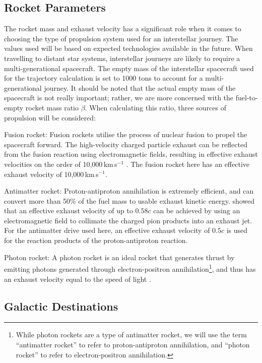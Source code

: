 \documentclass[review]{elsarticle}
\begin{document}
\subsection{Rocket Parameters}
The rocket mass and exhaust velocity has a significant role when it comes to choosing the type of propulsion system used for an interstellar journey. The values used will be based on expected technologies available in the future. When travelling to distant star systems, interstellar journeys are likely to require a multi-generational spacecraft. The empty mass of the interstellar spacecraft used for the trajectory calculation is set to 1000 tons to account for a multi-generational journey. It should be noted that the actual empty mass of the spacecraft is not really important; rather, we are more concerned with the fuel-to-empty rocket mass ratio $\beta$. When calculating this ratio, three sources of propulsion will be considered: 
\begin{itemize*}
\item Fusion rocket: Fusion rockets utilise the process of nuclear fusion to propel the spacecraft forward. The high-velocity charged particle exhaust can be reflected from the fusion reaction using electromagnetic fields, resulting in effective exhaust velocities on the order of 10,000\,km\,s$^{-1}$ \citep{Matloff2010}. The fusion rocket here has an effective exhaust velocity of 10,000\,km\,s$^{-1}$.
\item Antimatter rocket: Proton-antiproton annihilation is extremely efficient, and can convert more than 50\% of the fuel mass to usable exhaust kinetic energy. \citep{Westmoreland2010} showed that an effective exhaust velocity of up to $0.58c$ can be achieved by using an electromagnetic field to collimate the charged pion products into an exhaust jet. For the antimatter drive used here, an effective exhaust velocity of $0.5c$ is used for the reaction products of the proton-antiproton reaction.
\item Photon rocket: A photon rocket is an ideal rocket that generates thrust by emitting photons generated through electron-positron annihilation\footnote{While photon rockets are a type of antimatter rocket, we will use the term ``antimatter rocket'' to refer to proton-antiproton annihilation, and ``photon rocket'' to refer to electron-positron annihilation.}, and thus has an exhaust velocity equal to the speed of light \citep{Tinder2006}.
\end{itemize*}

\subsection{Galactic Destinations}
\end{document}
